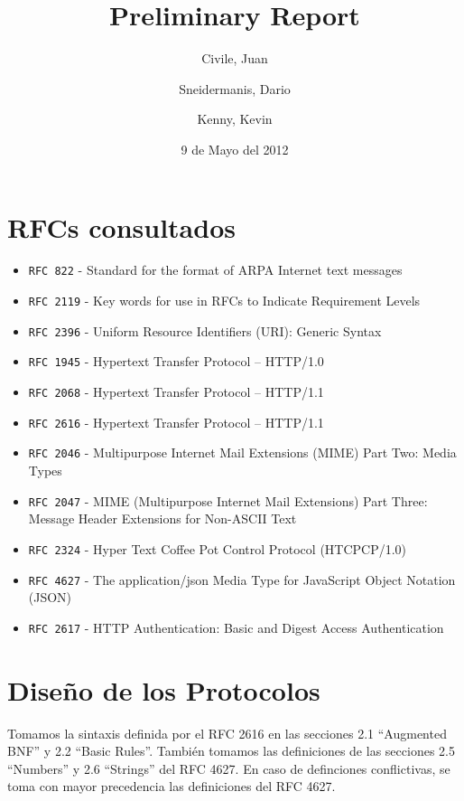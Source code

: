 \documentclass[11pt,a4paper,titlepage]{article}
\title{Preliminary Report}
\author{Civile, Juan \and Sneidermanis, Dario \and Kenny, Kevin}
\date{9 de Mayo del 2012}
\begin{document}
\newcommand{\awesome}[1]{\texttt{\large #1}}
\newcommand{\ua}{\textit{User Agent} }
\newcommand{\os}{\textit{Origin Server} }
\newcommand{\duta}{\awesome{dUta}}

\maketitle
\tableofcontents
\clearpage

\section{RFCs consultados}

\begin{itemize}

    \item \awesome{RFC 822}  - Standard for the format of ARPA Internet text messages
    \item \awesome{RFC 2119} - Key words for use in RFCs to Indicate Requirement Levels
    \item \awesome{RFC 2396} - Uniform Resource Identifiers (URI): Generic Syntax
    \item \awesome{RFC 1945} - Hypertext Transfer Protocol -- HTTP/1.0
    \item \awesome{RFC 2068} - Hypertext Transfer Protocol -- HTTP/1.1
    \item \awesome{RFC 2616} - Hypertext Transfer Protocol -- HTTP/1.1
    \item \awesome{RFC 2046} - Multipurpose Internet Mail Extensions (MIME) Part Two: Media Types
    \item \awesome{RFC 2047} - MIME (Multipurpose Internet Mail Extensions) Part Three: Message Header Extensions for Non-ASCII Text
    \item \awesome{RFC 2324} - Hyper Text Coffee Pot Control Protocol (HTCPCP/1.0)
    \item \awesome{RFC 4627} - The application/json Media Type for JavaScript Object Notation (JSON)
    \item \awesome{RFC 2617} - HTTP Authentication: Basic and Digest Access Authentication

\end{itemize}

\section{Diseño de los Protocolos}
Tomamos la sintaxis definida por el RFC 2616 en las secciones 2.1 ``Augmented BNF'' y 2.2 ``Basic Rules''.
También tomamos las definiciones de las secciones 2.5 ``Numbers'' y 2.6 ``Strings'' del RFC 4627.
En caso de definciones conflictivas, se toma con mayor precedencia las definiciones del RFC 4627.
\end{document}
